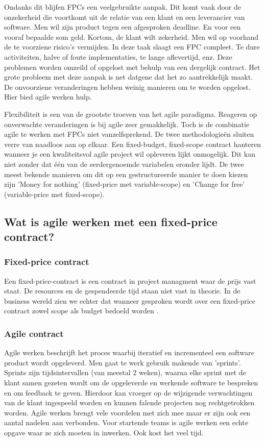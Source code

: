 \documentclass{hogent-article}
\begin{document}
    Ondanks dit blijfen FPCs een veelgebruikte aanpak. Dit komt vaak door de onzekerheid die voortkomt uit de relatie van een klant en een leverancier van software. Men wil zijn product tegen een afgesproken deadline. En voor een vooraf bepaalde som geld. Kortom, de klant wilt zekerheid. Men wil op voorhand de te voorziene risico's vermijden. In deze taak slaagt een FPC compleet. Te dure activiteiten, halve of foute implementaties, te lange aflevertijd, enz. Deze problemen worden omzeild of opgelost met behulp van een dergelijk contract. Het grote probleem met deze aanpak is net datgene dat het zo aantrekkelijk maakt. De onvoorziene veranderingen hebben weinig manieren om te worden opgelost. Hier bied agile werken hulp.
    
    Flexibiliteit is een van de grootste troeven van het agile paradigma. Reageren op onverwachte veranderingen is bij agile zeer gemakkelijk. Toch is de combinatie agile te werken met FPCs niet vanzelfsprekend. De twee methodologieën sluiten verre van naadloos aan op elkaar. Een fixed-budget, fixed-scope contract hanteren wanneer je een kwaliteitsvol agile project wil opleveren lijkt onmogelijk. Dit kan niet zonder dat één van de eerdergenoemde variabelen eronder lijdt. De twee meest bekende manieren om dit op een gestructureerde manier te doen kiezen zijn 'Money for nothing' (fixed-price met variable-scope) en 'Change for free' (variable-price met fixed-scope). 
	
    \subsection{Wat is agile werken met een fixed-price contract?}
    \subsubsection{Fixed-price contract}
     Een fixed-price-contract is een contract in project managment waar de prijs vast staat. De resources en de gespendeerde tijd staan niet vast \autocite{PMK} in theorie. In de business wereld zien we echter dat wanneer gesproken wordt over een fixed-price contract zowel scope als budget bedoeld worden \autocite{PMI2011}.
     \subsubsection{Agile contract}
     Agile werken beschrijft het proces waarbij iteratief en incrementeel een software product wordt opgeleverd. Men gaat te werk gebruik makende van 'sprints'. Sprints zijn tijdsintervallen (van meestal 2 weken), waarna elke sprint met de klant samen gezeten wordt om de opgeleverde en werkende software te bespreken en om feedback te geven. Hierdoor kan vroeger op de wijzigende verwachtingen van de klant ingespeeld worden en kunnen falende projecten nog rechtgetrokken worden. Agile werken brengt vele voordelen met zich mee maar er zijn ook een aantal nadelen aan verbonden. Voor startende teams is agile werken een echte opgave waar ze zich moeten in inwerken. Ook kost het veel tijd.
    
\end{document}
